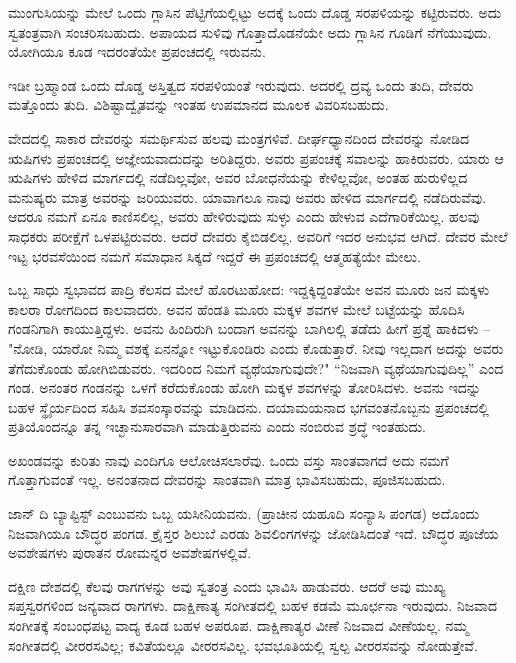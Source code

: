 ಮುಂಗುಸಿಯನ್ನು ಮೇಲೆ ಒಂದು ಗ್ಲಾಸಿನ ಪೆಟ್ಟಿಗೆಯಲ್ಲಿಟ್ಟು ಅದಕ್ಕೆ ಒಂದು ದೊಡ್ಡ ಸರಪಳಿಯನ್ನು ಕಟ್ಟಿರುವರು. ಅದು ಸ್ವತಂತ್ರವಾಗಿ ಸಂಚರಿಸಬಹುದು. ಅಪಾಯದ ಸುಳಿವು ಗೊತ್ತಾದೊಡನೆಯೇ ಅದು ಗ್ಲಾಸಿನ ಗೂಡಿಗೆ ನೆಗೆಯುವುದು. ಯೋಗಿಯೂ ಕೂಡ ಇದರಂತೆಯೇ ಪ್ರಪಂಚದಲ್ಲಿ ಇರುವನು.

ಇಡೀ ಬ್ರಹ್ಮಾಂಡ ಒಂದು ದೊಡ್ಡ ಅಸ್ತಿತ್ವದ ಸರಪಳಿಯಂತೆ ಇರುವುದು. ಅದರಲ್ಲಿ ದ್ರವ್ಯ  ಒಂದು ತುದಿ, ದೇವರು ಮತ್ತೊಂದು ತುದಿ. ವಿಶಿಷ್ಟಾದ್ವೈತವನ್ನು ಇಂತಹ ಉಪಮಾನದ ಮೂಲಕ ವಿವರಿಸಬಹುದು.

ವೇದದಲ್ಲಿ ಸಾಕಾರ ದೇವರನ್ನು ಸಮರ್ಥಿಸುವ ಹಲವು ಮಂತ್ರಗಳಿವೆ. ದೀರ್ಘಧ್ಯಾನದಿಂದ ದೇವರನ್ನು ನೋಡಿದ ಋಷಿಗಳು ಪ್ರಪಂಚದಲ್ಲಿ ಅಜ್ಞೇಯವಾದುದನ್ನು ಅರಿತಿದ್ದರು. ಅವರು ಪ್ರಪಂಚಕ್ಕೆ ಸವಾಲನ್ನು ಹಾಕಿರುವರು. ಯಾರು ಆ ಋಷಿಗಳು ಹೇಳಿದ ಮಾರ್ಗದಲ್ಲಿ ನಡೆದಿಲ್ಲವೋ, ಅವರ ಬೋಧನೆಯನ್ನು ಕೇಳಿಲ್ಲವೋ, ಅಂತಹ ಹುರುಳಿಲ್ಲದ ಮನುಷ್ಯರು ಮಾತ್ರ ಅವರನ್ನು ಜರಿಯುವರು. ಯಾವಾಗಲೂ ನಾವು ಅವರು ಹೇಳಿದ ಮಾರ್ಗದಲ್ಲಿ ನಡೆದಿರುವೆವು. ಆದರೂ ನಮಗೆ ಏನೂ ಕಾಣಿಸಲಿಲ್ಲ, ಅವರು ಹೇಳಿರುವುದು ಸುಳ್ಳು ಎಂದು ಹೇಳುವ ಎದೆಗಾರಿಕೆಯಿಲ್ಲ. ಹಲವು ಸಾಧಕರು ಪರೀಕ್ಷೆಗೆ ಒಳಪಟ್ಟಿರುವರು. ಆದರೆ ದೇವರು ಕೈಬಿಡಲಿಲ್ಲ. ಅವರಿಗೆ ಇದರ ಅನುಭವ ಆಗಿದೆ. ದೇವರ ಮೇಲೆ ಇಟ್ಟ ಭರವಸೆಯಿಂದ ನಮಗೆ ಸಮಾಧಾನ ಸಿಕ್ಕದೆ ಇದ್ದರೆ ಈ ಪ್ರಪಂಚದಲ್ಲಿ ಆತ್ಮಹತ್ಯೆಯೇ ಮೇಲು.

ಒಬ್ಬ ಸಾಧು ಸ್ವಭಾವದ ಪಾದ್ರಿ ಕೆಲಸದ ಮೇಲೆ ಹೊರಟುಹೋದ: ಇದ್ದಕ್ಕಿದ್ದಂತೆಯೇ ಅವನ ಮೂರು ಜನ ಮಕ್ಕಳು ಕಾಲರಾ ರೋಗದಿಂದ ಕಾಲವಾದರು. ಅವನ ಹೆಂಡತಿ ಮೂರು ಮಕ್ಕಳ ಶವಗಳ ಮೇಲೆ ಬಟ್ಟೆಯನ್ನು ಹೊದಿಸಿ ಗಂಡನಿಗಾಗಿ ಕಾಯುತ್ತಿದ್ದಳು. ಅವನು ಹಿಂದಿರುಗಿ ಬಂದಾಗ ಅವನನ್ನು ಬಾಗಿಲಲ್ಲಿ ತಡೆದು ಹೀಗೆ ಪ್ರಶ್ನೆ ಹಾಕಿದಳು – "ನೋಡಿ, ಯಾರೋ ನಿಮ್ಮ ವಶಕ್ಕೆ ಏನನ್ನೋ ಇಟ್ಟುಕೊಂಡಿರು ಎಂದು ಕೊಡುತ್ತಾರೆ. ನೀವು ಇಲ್ಲದಾಗ ಅದನ್ನು ಅವರು ತೆಗೆದುಕೊಂಡು ಹೋಗಿಬಿಡುವರು. ಇದರಿಂದ ನಿಮಗೆ ವ್ಯಥೆಯಾಗುವುದೇ?" “ನಿಜವಾಗಿ ವ್ಯಥೆಯಾಗುವುದಿಲ್ಲ” ಎಂದ ಗಂಡ. ಅನಂತರ ಗಂಡನನ್ನು ಒಳಗೆ ಕರೆದುಕೊಂಡು ಹೋಗಿ ಮಕ್ಕಳ ಶವಗಳನ್ನು ತೋರಿಸಿದಳು. ಅವನು ಇದನ್ನು ಬಹಳ ಸ್ಥೈರ್ಯದಿಂದ ಸಹಿಸಿ ಶವಸಂಸ್ಕಾರವನ್ನು ಮಾಡಿದನು. ದಯಾಮಯನಾದ ಭಗವಂತನೊಬ್ಬನು ಪ್ರಪಂಚದಲ್ಲಿ ಪ್ರತಿಯೊಂದನ್ನೂ ತನ್ನ ಇಚ್ಛಾನುಸಾರವಾಗಿ ಮಾಡುತ್ತಿರುವನು ಎಂದು ನಂಬಿರುವ ಶ್ರದ್ಧೆ ಇಂತಹುದು.

ಅಖಂಡವನ್ನು ಕುರಿತು ನಾವು ಎಂದಿಗೂ ಆಲೋಚಿಸಲಾರೆವು. ಒಂದು ವಸ್ತು ಸಾಂತವಾಗದೆ ಅದು ನಮಗೆ ಗೊತ್ತಾಗುವಂತೆ ಇಲ್ಲ. ಅನಂತನಾದ ದೇವರನ್ನು ಸಾಂತವಾಗಿ ಮಾತ್ರ ಭಾವಿಸಬಹುದು, ಪೂಜಿಸಬಹುದು.

ಜಾನ್ ದಿ ಬ್ಯಾಪ್ಟಿಸ್ಟ್ ಎಂಬುವನು ಒಬ್ಬ ಯಸೀನಿಯವನು. (ಪ್ರಾಚೀನ ಯಹೂದಿ ಸಂನ್ಯಾಸಿ ಪಂಗಡ) ಅದೊಂದು ನಿಜವಾಗಿಯೂ ಬೌದ್ಧರ ಪಂಗಡ. ಕ್ರೈಸ್ತರ ಶಿಲುಬೆ ಎರಡು ಶಿವಲಿಂಗಗಳನ್ನು ಜೋಡಿಸಿದಂತೆ ಇದೆ. ಬೌದ್ಧರ ಪೂಜೆಯ ಅವಶೇಷಗಳು ಪುರಾತನ ರೋಮನ್ನರ ಅವಶೇಷಗಳಲ್ಲಿವೆ.

ದಕ್ಷಿಣ ದೇಶದಲ್ಲಿ ಕೆಲವು ರಾಗಗಳನ್ನು ಅವು ಸ್ವತಂತ್ರ ಎಂದು ಭಾವಿಸಿ ಹಾಡುವರು. ಆದರೆ ಅವು ಮುಖ್ಯ ಸಪ್ತಸ್ವರಗಳಿಂದ ಜನ್ಯವಾದ ರಾಗಗಳು. ದಾಕ್ಷಿಣಾತ್ಯ ಸಂಗೀತದಲ್ಲಿ ಬಹಳ ಕಡಮೆ ಮೂರ್ಛನಾ ಇರುವುದು. ನಿಜವಾದ ಸಂಗೀತಕ್ಕೆ ಸಂಬಂಧಪಟ್ಟ ವಾದ್ಯ ಕೂಡ ಬಹಳ ಅಪರೂಪ. ದಾಕ್ಷಿಣಾತ್ಯರ ವೀಣೆ ನಿಜವಾದ ವೀಣೆಯಲ್ಲ. ನಮ್ಮ ಸಂಗೀತದಲ್ಲಿ ವೀರರಸವಿಲ್ಲ; ಕವಿತೆಯಲ್ಲೂ ವೀರರಸವಿಲ್ಲ. ಭವಭೂತಿಯಲ್ಲಿ ಸ್ವಲ್ಪ ವೀರರಸವನ್ನು ನೋಡುತ್ತೇವೆ.

\delimiter

